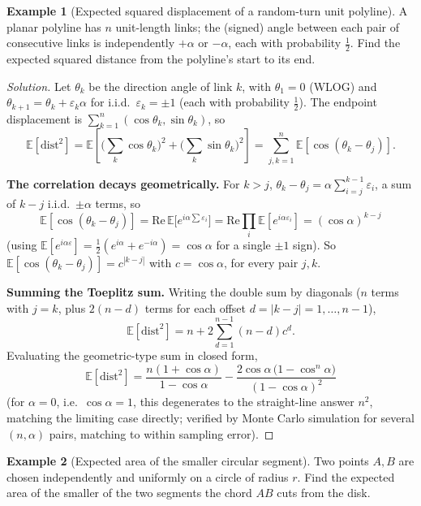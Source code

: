 \documentclass[11pt]{article}
\theoremstyle{definition}
\newtheorem{example}{Example}[section]
\newcommand{\E}{\mathbb{E}}
\begin{document}
\begin{example}[Expected squared displacement of a random-turn unit polyline]
A planar polyline has $n$ unit-length links; the (signed) angle between each pair of consecutive links is independently $+\alpha$ or $-\alpha$, each with probability $\tfrac12$. Find the expected squared distance from the polyline's start to its end.
\end{example}

\begin{proof}[Solution]
Let $\theta_k$ be the direction angle of link $k$, with $\theta_1=0$ (WLOG) and $\theta_{k+1}=\theta_k+\varepsilon_k\alpha$ for i.i.d.\ $\varepsilon_k=\pm1$ (each with probability $\tfrac12$). The endpoint displacement is $\sum_{k=1}^n(\cos\theta_k,\sin\theta_k)$, so
\[
\E[\text{dist}^2]=\E\!\left[\Big(\sum_k\cos\theta_k\Big)^2+\Big(\sum_k\sin\theta_k\Big)^2\right]=\sum_{j,k=1}^n\E[\cos(\theta_k-\theta_j)].
\]

\textbf{The correlation decays geometrically.} For $k>j$, $\theta_k-\theta_j=\alpha\sum_{i=j}^{k-1}\varepsilon_i$, a sum of $k-j$ i.i.d.\ $\pm\alpha$ terms, so
\[
\E[\cos(\theta_k-\theta_j)]=\mathrm{Re}\,\E\big[e^{i\alpha\sum\varepsilon_i}\big]=\mathrm{Re}\prod_i\E[e^{i\alpha\varepsilon_i}]=(\cos\alpha)^{k-j}
\]
(using $\E[e^{i\alpha\varepsilon}]=\tfrac12(e^{i\alpha}+e^{-i\alpha})=\cos\alpha$ for a single $\pm1$ sign). So $\E[\cos(\theta_k-\theta_j)]=c^{|k-j|}$ with $c=\cos\alpha$, for every pair $j,k$.

\textbf{Summing the Toeplitz sum.} Writing the double sum by diagonals ($n$ terms with $j=k$, plus $2(n-d)$ terms for each offset $d=|k-j|=1,\dots,n-1$),
\[
\E[\text{dist}^2]=n+2\sum_{d=1}^{n-1}(n-d)c^d.
\]
Evaluating the geometric-type sum in closed form,
\[
\boxed{\E[\text{dist}^2]=\frac{n(1+\cos\alpha)}{1-\cos\alpha}-\frac{2\cos\alpha\,\bigl(1-\cos^n\alpha\bigr)}{(1-\cos\alpha)^2}}
\]
(for $\alpha=0$, i.e.\ $\cos\alpha=1$, this degenerates to the straight-line answer $n^2$, matching the limiting case directly; verified by Monte Carlo simulation for several $(n,\alpha)$ pairs, matching to within sampling error).
\end{proof}

\begin{example}[Expected area of the smaller circular segment]
Two points $A,B$ are chosen independently and uniformly on a circle of radius $r$. Find the expected area of the smaller of the two segments the chord $AB$ cuts from the disk.
\end{example}
\end{document}
